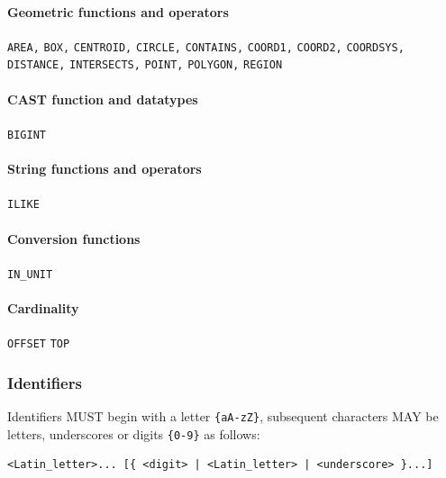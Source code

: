 \documentclass[11pt,a4paper]{ivoa}
\begin{document}
\begin{raggedright}
\paragraph{Geometric functions and operators}
\texttt{AREA,} \texttt{BOX,} \texttt{CENTROID,} \texttt{CIRCLE,}
\texttt{CONTAINS,} \texttt{COORD1,} \texttt{COORD2,}
\texttt{COORDSYS,} \texttt{DISTANCE,} \texttt{INTERSECTS,}
\texttt{POINT,} \texttt{POLYGON,} \texttt{REGION}
\end{raggedright}

\begin{raggedright}
\paragraph{CAST function and datatypes}
\texttt{BIGINT}
\end{raggedright}

\begin{raggedright}
\paragraph{String functions and operators}
\texttt{ILIKE}
\end{raggedright}

\begin{raggedright}
\paragraph{Conversion functions}
\texttt{IN\_UNIT}
\end{raggedright}

\begin{raggedright}
\paragraph{Cardinality}
\texttt{OFFSET} \texttt{TOP}
\end{raggedright}


\subsubsection{Identifiers}
\label{sec:adql.identifiers}

Identifiers MUST begin with a letter
\verb:{aA-zZ}:, subsequent characters MAY be letters, underscores or
digits \verb:{0-9}: as follows:

\begin{verbatim}
<Latin_letter>... [{ <digit> | <Latin_letter> | <underscore> }...]
\end{verbatim}
\end{document}
